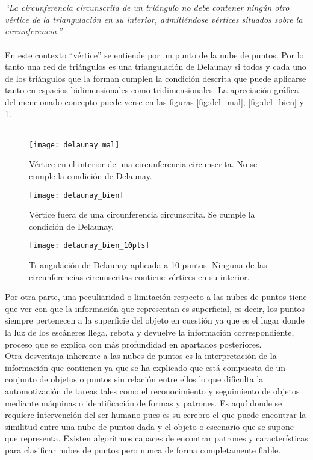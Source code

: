 \\
\\
\textit{``La circunferencia circunscrita de un triángulo no debe contener ningún otro vértice de la triangulación en su interior, admitiéndose vértices situados sobre la circunferencia.''}
\\
\\
En este contexto ``vértice'' se entiende por un punto de la nube de puntos.
Por lo tanto una red de triángulos es una triangulación de Delaunay si todos y cada uno de los triángulos que la forman cumplen la condición descrita que puede aplicarse tanto en espacios bidimensionales como tridimensionales. La apreciación gráfica del mencionado concepto puede verse en las figuras \ref{fig:del_mal}, \ref{fig:del_bien} y \ref{fig:del_bien_10pts}.
\\
\\
\begin{figure}[!htb]
  \texttt{[image: delaunay\_mal]} 
\caption{Vértice en el interior de una circunferencia circunscrita. No se cumple la condición de Delaunay.}
\label{fig:del_mal}
\endminipage\hfill
{}
 \texttt{[image: delaunay\_bien]}
\caption{Vértice fuera de una circunferencia circunscrita. Se cumple la condición de Delaunay.}
\label{fig:del_bien}
\endminipage\hfill
{}
  \texttt{[image: delaunay\_bien\_10pts]}
\caption{Triangulación de Delaunay aplicada a 10 puntos. Ninguna de las circunferencias circunscritas contiene vértices en su interior.}
\label{fig:del_bien_10pts}
\endminipage\hfill
\end{figure}
Por otra parte, una peculiaridad o limitación respecto a las nubes de puntos tiene que ver con que la
información que representan es superficial, es decir, los puntos siempre pertenecen a la superficie del
objeto en cuestión ya que es el lugar donde la luz de los escáneres llega, rebota y devuelve la
información correspondiente, proceso que se explica con más profundidad en apartados posteriores.
\\
Otra desventaja inherente a las nubes de puntos es la interpretación de la información que contienen ya
que se ha explicado que está compuesta de un conjunto de objetos o puntos sin relación entre ellos lo que dificulta la automotización de tareas tales como el reconocimiento y seguimiento de objetos mediante máquinas o identificación de formas y patrones. Es
aquí donde se requiere intervención del ser humano pues es su cerebro el que puede encontrar la similitud
entre una nube de puntos dada y el objeto o escenario que se supone que representa. Existen algoritmos capaces
de encontrar patrones y características para clasificar nubes de puntos pero nunca de forma
completamente fiable.

